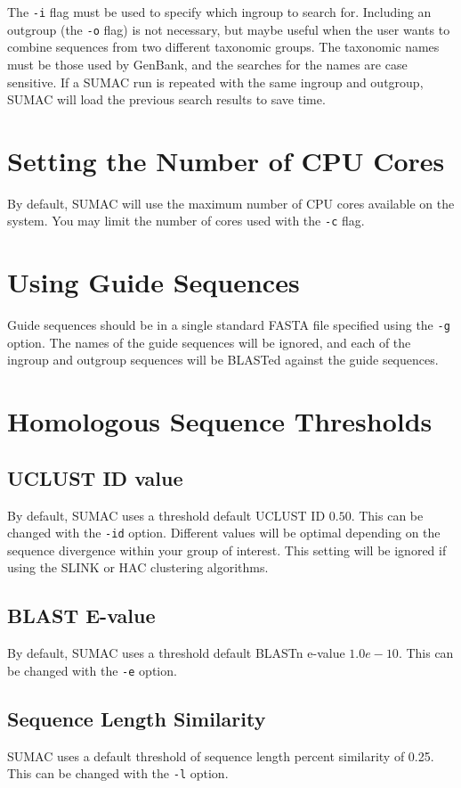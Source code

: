\documentclass[10pt]{report}
\begin{document}
The \verb|-i| flag must be used to specify which ingroup to search for. 
Including an outgroup (the \texttt{-o} flag) is not necessary, 
but maybe useful when the user wants to combine sequences from two
different taxonomic groups.
The taxonomic names must be those used by GenBank, and the 
searches for the names are case sensitive.
If a SUMAC run is repeated with the same ingroup and outgroup, SUMAC
will load the previous search results to save time.

\section{Setting the Number of CPU Cores}

By default, SUMAC will use the maximum number of CPU cores
available on the system. You may limit the number of cores
used with the \texttt{-c} flag.

\section{Using Guide Sequences}

Guide sequences should be in a single standard FASTA file specified
using the \verb|-g| option. The names of the
guide sequences will be ignored, and each of the ingroup and outgroup 
sequences will be BLASTed against the guide sequences.

\section{Homologous Sequence Thresholds}

\subsection{UCLUST ID value}
By default, SUMAC uses a threshold default UCLUST ID $0.50$.
This can be changed with the \verb|-id| option.
Different values will be optimal depending on the sequence
divergence within your group of interest.
This setting will be ignored if using the SLINK or HAC
clustering algorithms.

\subsection{BLAST E-value}
By default, SUMAC uses a threshold default BLASTn e-value $1.0e-10$.
This can be changed with the \verb|-e| option.

\subsection{Sequence Length Similarity}
SUMAC uses a default threshold of sequence length percent similarity
of 0.25. This can be changed with the \verb|-l| option.
\end{document}
